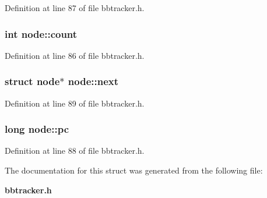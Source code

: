 Definition at line 87 of file bbtracker.h.
\subsubsection[{count}]{\setlength{\rightskip}{0pt plus 5cm}int {\bf node::count}}\label{structnode_e00bf56112dc8c807b99232c21fadbdc}




Definition at line 86 of file bbtracker.h.
\subsubsection[{next}]{\setlength{\rightskip}{0pt plus 5cm}struct {\bf node}$\ast$ {\bf node::next}\hspace{0.3cm}{\tt  [read]}}\label{structnode_a3e8aa83f864292b5a01210f4453fcc0}




Definition at line 89 of file bbtracker.h.
\subsubsection[{pc}]{\setlength{\rightskip}{0pt plus 5cm}long {\bf node::pc}}\label{structnode_f27f1671794da0670c1d782677a86916}




Definition at line 88 of file bbtracker.h.

The documentation for this struct was generated from the following file:\begin{CompactItemize}
\item 
{\bf bbtracker.h}\end{CompactItemize}
